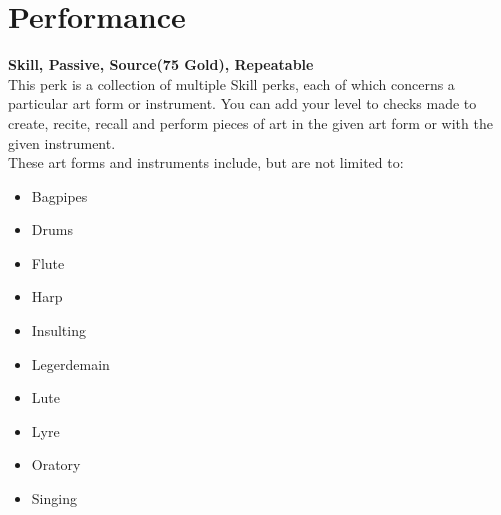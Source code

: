 \section{Performance}\label{sec:performance}
\textbf{Skill, Passive, Source(75 Gold), Repeatable}\\
This perk is a collection of multiple Skill perks, each of which concerns a particular art form or instrument. You can add your level to checks made to create, recite, recall and perform pieces of art in the given art form or with the given instrument.\\
These art forms and instruments include, but are not limited to:\\

\begin{itemize}
\item Bagpipes
\item Drums
\item Flute
\item Harp
\item Insulting
\item Legerdemain
\item Lute
\item Lyre
\item Oratory
\item Singing
\end{itemize}